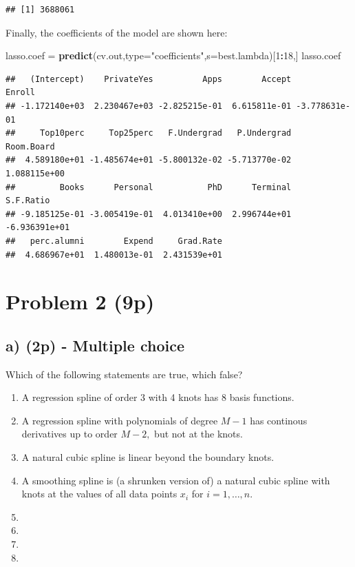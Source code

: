 \documentclass[]{article}
\newenvironment{Shaded}{\begin{snugshade}}{\end{snugshade}}
\newcommand{\DataTypeTok}[1]{\textcolor[rgb]{0.13,0.29,0.53}{#1}}
\newcommand{\DecValTok}[1]{\textcolor[rgb]{0.00,0.00,0.81}{#1}}
\newcommand{\KeywordTok}[1]{\textcolor[rgb]{0.13,0.29,0.53}{\textbf{#1}}}
\newcommand{\NormalTok}[1]{#1}
\newcommand{\OperatorTok}[1]{\textcolor[rgb]{0.81,0.36,0.00}{\textbf{#1}}}
\newcommand{\StringTok}[1]{\textcolor[rgb]{0.31,0.60,0.02}{#1}}
\begin{document}
\begin{verbatim}
## [1] 3688061
\end{verbatim}

Finally, the coefficients of the model are shown here:

\begin{Shaded}
\begin{Highlighting}[]
\NormalTok{lasso.coef =}\StringTok{ }\KeywordTok{predict}\NormalTok{(cv.out,}\DataTypeTok{type=}\StringTok{"coefficients"}\NormalTok{,}\DataTypeTok{s=}\NormalTok{best.lambda)[}\DecValTok{1}\OperatorTok{:}\DecValTok{18}\NormalTok{,]}
\NormalTok{lasso.coef}
\end{Highlighting}
\end{Shaded}

\begin{verbatim}
##   (Intercept)    PrivateYes          Apps        Accept        Enroll 
## -1.172140e+03  2.230467e+03 -2.825215e-01  6.615811e-01 -3.778631e-01 
##     Top10perc     Top25perc   F.Undergrad   P.Undergrad    Room.Board 
##  4.589180e+01 -1.485674e+01 -5.800132e-02 -5.713770e-02  1.088115e+00 
##         Books      Personal           PhD      Terminal     S.F.Ratio 
## -9.185125e-01 -3.005419e-01  4.013410e+00  2.996744e+01 -6.936391e+01 
##   perc.alumni        Expend     Grad.Rate 
##  4.686967e+01  1.480013e-01  2.431539e+01
\end{verbatim}

\hypertarget{problem-2-9p}{%
\section{Problem 2 (9p)}\label{problem-2-9p}}

\hypertarget{a-2p---multiple-choice}{%
\subsection{a) (2p) - Multiple choice}\label{a-2p---multiple-choice}}

Which of the following statements are true, which false?

\begin{enumerate}
\def\labelenumi{(\roman{enumi})}
\item
  A regression spline of order 3 with 4 knots has 8 basis functions.
\item
  A regression spline with polynomials of degree \(M-1\) has continous
  derivatives up to order \(M-2,\) but not at the knots.
\item
  A natural cubic spline is linear beyond the boundary knots.
\item
  A smoothing spline is (a shrunken version of) a natural cubic spline
  with knots at the values of all data points \(x_i\) for
  \(i=1,\ldots ,n\).
\item
\item
\item
\item
\end{enumerate}
\end{document}
